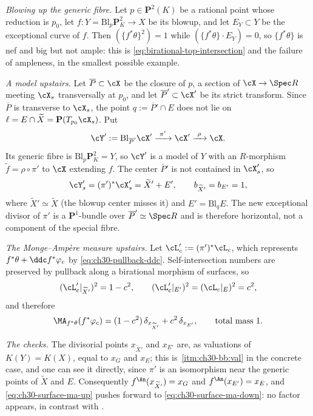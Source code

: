 \begin{example}
\emph{Blowing up the generic fibre.}  Let $p\in\mathbf P^2(K)$ be a
rational point whose reduction is $p_0$, let
$f:Y=\mathrm{Bl}_p\mathbf P^2_K\to X$ be its blowup, and let
$E_Y\subset Y$ be the exceptional curve of $f$.  Then
$(\{f^*\theta\}^2)=1$ while $(\{f^*\theta\}\cdot E_Y)=0$, so
$\{f^*\theta\}$ is nef and big but not ample: this is
\eqref{eq:birational-top-intersection} and the failure of ampleness, in the
smallest possible example.

\emph{A model upstairs.}  Let $\overline P\subset\cX$ be the closure of
$p$, a section of $\cX\to\Spec R$ meeting $\cX_s$ transversally at
$p_0$, and let $\overline P'\subset\cX'$ be its strict transform.  Since
$\overline P$ is transverse to $\cX_s$, the point
$q:=\overline P'\cap E$ does not lie on
$\ell=E\cap\widetilde X=\mathbf P(T_{p_0}\cX_s)$.  Put
\[
 \cY':=\mathrm{Bl}_{\overline P'}\cX'
 \xrightarrow{\ \pi'\ }\cX'\xrightarrow{\ \rho\ }\cX .
\]
Its generic fibre is $\mathrm{Bl}_p\mathbf P^2_K=Y$, so $\cY'$ is a
model of $Y$ with an $R$-morphism $\tilde f=\rho\circ\pi'$ to $\cX$
extending $f$.  The center $\overline P'$ is not contained in
$\cX'_s$, so
\[
 \cY'_s=(\pi')^*\cX'_s=\widetilde X'+E',
 \qquad b_{\widetilde X'}=b_{E'}=1,
\]
where $\widetilde X'\simeq\widetilde X$ (the blowup center misses it) and
$E'=\mathrm{Bl}_q E$.  The new exceptional divisor of $\pi'$ is a
$\mathbf P^1$-bundle over $\overline P'\simeq\Spec R$ and is therefore
horizontal, not a component of the special fibre.

\emph{The Monge--Amp\`ere measure upstairs.}  Let
$\cL'_c:=(\pi')^*\cL_c$, which represents
$f^*\theta+\ddc f^*\varphi_c$ by
\eqref{eq:ch30-pullback-ddc}.  Self-intersection numbers are preserved by
pullback along a birational morphism of surfaces, so
\[
 (\cL'_c|_{\widetilde X'})^2=1-c^2,
 \qquad
 (\cL'_c|_{E'})^2=(\cL_c|_E)^2=c^2 ,
\]
and therefore
\begin{equation}
\label{eq:ch30-surface-ma-up}
 \MA_{f^*\theta}(f^*\varphi_c)
 =(1-c^2)\,\delta_{x_{\widetilde X'}}+c^2\,\delta_{x_{E'}},
 \qquad
 \text{total mass}\ 1 .
\end{equation}

\emph{The checks.}  The divisorial points $x_{\widetilde X'}$ and
$x_{E'}$ are, as valuations of $K(Y)=K(X)$, equal to $x_G$ and
$x_E$; this is
\,\cref{itm:ch30-bb:val} in the concrete
case, and one can see it directly, since $\pi'$ is an isomorphism near the
generic points of $\widetilde X$ and $E$.  Consequently
$f^{\An}(x_{\widetilde X'})=x_G$ and $f^{\An}(x_{E'})=x_E$, and
\eqref{eq:ch30-surface-ma-up} pushes forward to
\eqref{eq:ch30-surface-ma-down}: no factor appears, in contrast with
.


\end{example}
